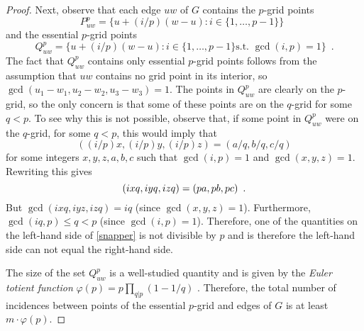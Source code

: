 \documentclass{patmorin}
\begin{document}
\begin{proof}
  Next, observe that each edge $uw$ of $G$
  contains the $p$-grid points
  \[
      P_{uw}^p = \{ u+(i/p)(w-u) : i\in\{1,\ldots,p-1\} \} \enspace 
  \]
  and the essential $p$-grid points
  \[
      Q_{uw}^p = \{ u+(i/p)(w-u) : i\in\{1,\ldots,p-1\}\mbox{
         s.t. }\gcd(i,p)=1 \} \enspace .
  \]
  The fact that $Q_{uw}^p$ contains only essential $p$-grid points follows
  from the assumption that $uw$ contains no grid point in its interior,
  so $\gcd(u_1-w_1, u_2-w_2, u_3-w_3)=1$.  The points in $Q_{uw}^p$
  are clearly on the $p$-grid, so the only concern is that some of
  these points are on the $q$-grid for some $q<p$.  To see why this is
  not possible, observe that, if some point in $Q_{uw}^p$ were on the
  $q$-grid, for some $q<p$, this would imply that
  \[  ((i/p)x,(i/p)y,(i/p)z) = (a/q,b/q,c/q) \]
  for some integers $x,y,z,a,b,c$ such that $\gcd(i,p)=1$ and
  $\gcd(x,y,z)=1$. Rewriting this gives
  \begin{equation}
     (ixq,iyq,izq) = (pa,pb,pc) \enspace .   \eqlabel{snapper}
  \end{equation}
  But $\gcd(ixq,iyz,izq)=iq$ (since $\gcd(x,y,z)=1$).  Furthermore,
  $\gcd(iq,p) \le q < p$ (since $\gcd(i,p)=1$).  Therefore, one of the
  quantities on the left-hand side of \eqref{snapper} is not divisible
  by $p$ and is therefore the left-hand side can not equal the
  right-hand side.

  The size of the set $Q_{uw}^p$ is a well-studied quantity and is given
  by the \emph{Euler totient function} $\varphi(p)=p\prod_{q|p}(1-1/q)$
  \cite[Section~5.5]{hardy.wright:introduction}.  Therefore, the total
  number of incidences between points of the essential $p$-grid and
  edges of $G$ is at least $m\cdot\varphi(p)$.


\end{proof}
\end{document}
